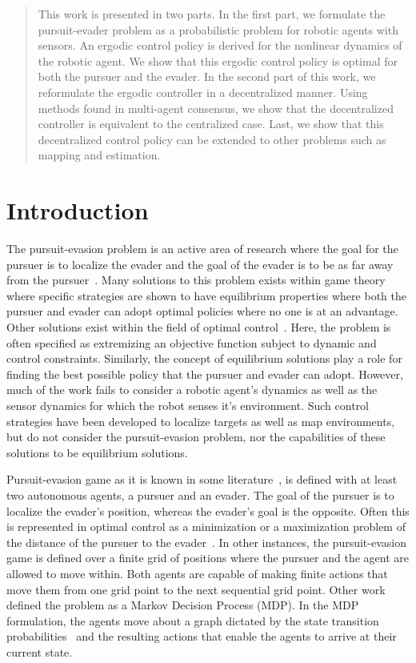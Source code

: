 \documentclass[conference]{IEEEtran}
\begin{document}
\begin{abstract}
    This work is presented in two parts.
    In the first part, we formulate the pursuit-evader problem as a probabilistic problem for robotic agents with sensors.
    An ergodic control policy is derived for the nonlinear dynamics of the robotic agent.
    We show that this ergodic control policy is optimal for both the pursuer and the evader.
    In the second part of this work, we reformulate the ergodic controller in a decentralized manner.
    Using methods found in multi-agent consensus, we show that the decentralized controller is equivalent to the centralized case.
    Last, we show that this decentralized control policy can be extended to other problems such as mapping and estimation.
\end{abstract}

\IEEEpeerreviewmaketitle

\section{Introduction}

The pursuit-evasion problem is an active area of research where the goal for the pursuer is to localize the evader and the goal of the evader is to be as far away from the pursuer~\citet{++}.
Many solutions to this problem exists within game theory~\citet{++} where specific strategies are shown to have equilibrium properties where both the pursuer and evader can adopt optimal policies where no one is at an advantage.
Other solutions exist within the field of optimal control~\citet{++}.
Here, the problem is often specified as extremizing an objective function subject to dynamic and control constraints.
Similarly, the concept of equilibrium solutions play a role for finding the best possible policy that the pursuer and evader can adopt.
However, much of the work fails to consider a robotic agent's dynamics as well as the sensor dynamics for which the robot senses it's environment.
Such control strategies have been developed to localize targets as well as map environments, but do not consider the pursuit-evasion problem, nor the capabilities of these solutions to be equilibrium solutions.

Pursuit-evasion game as it is known in some literature~\cite{++}, is defined with at least two autonomous agents, a pursuer and an evader.
The goal of the pursuer is to localize the evader's position, whereas the evader's goal is the opposite.
Often this is represented in optimal control as a minimization or a maximization problem of the distance of the pursuer to the evader~\cite{++}. 
In other instances, the pursuit-evasion game is defined over a finite grid of positions where the pursuer and the agent are allowed to move within. 
Both agents are capable of making finite actions that move them from one grid point to the next sequential grid point.
Other work defined the problem as a Markov Decision Process (MDP). 
In the MDP formulation, the agents move about a graph dictated by the state transition probabilities~\cite{++} and the resulting actions that enable the agents to arrive at their current state.
\end{document}
